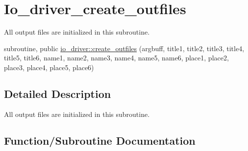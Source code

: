 \hypertarget{group__io__driver__create__outfiles}{}\section{Io\+\_\+driver\+\_\+create\+\_\+outfiles}
\label{group__io__driver__create__outfiles}


All output files are initialized in this subroutine.  


\begin{DoxyCompactItemize}
\item 
subroutine, public \hyperlink{group__io__driver__create__outfiles_ga2eac450ef320091bf7724cf6b178e040}{io\+\_\+driver\+::create\+\_\+outfiles} (argbuff, title1, title2, title3, title4, title5, title6, name1, name2, name3, name4, name5, name6, place1, place2, place3, place4, place5, place6)
\end{DoxyCompactItemize}


\subsection{Detailed Description}
All output files are initialized in this subroutine. 



\subsection{Function/\+Subroutine Documentation}
\hypertarget{group__io__driver__create__outfiles_ga2eac450ef320091bf7724cf6b178e040}{}
